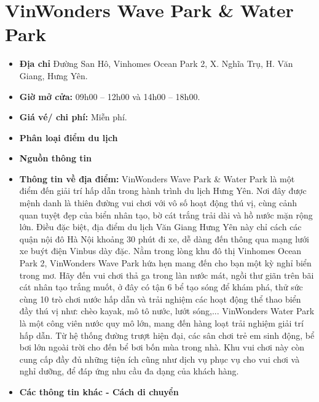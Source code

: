 \documentclass{article}
\begin{document}
\section{VinWonders Wave Park \& Water Park}
\begin{itemize}
    \item{\textbf{Địa chỉ}} Đường San Hô, Vinhomes Ocean Park 2, X. Nghĩa Trụ, H. Văn Giang, Hưng Yên.

    \item{\textbf{Giờ mở cửa:}} 09h00 – 12h00 và 14h00 – 18h00.

    \item{\textbf{Giá vé/ chi phí:}} Miễn phí.

    \item{\textbf{Phân loại điểm du lịch}} 

    \item{\textbf{Nguồn thông tin}} 

    \item{\textbf{Thông tin về địa điểm:}} VinWonders Wave Park \& Water Park là một điểm đến giải trí hấp dẫn trong hành trình du lịch Hưng Yên. Nơi đây được mệnh danh là thiên đường vui chơi với vô số hoạt động thú vị, cùng cảnh quan tuyệt đẹp của biển nhân tạo, bờ cát trắng trải dài và hồ nước mặn rộng lớn. Điều đặc biệt, địa điểm du lịch Văn Giang Hưng Yên này chỉ cách các quận nội đô Hà Nội khoảng 30 phút đi xe, dễ dàng đến thông qua mạng lưới xe buýt điện Vinbus dày đặc.
    Nằm trong lòng khu đô thị Vinhomes Ocean Park 2, VinWonders Wave Park hứa hẹn mang đến cho bạn một kỳ nghỉ biển trong mơ. Hãy đến vui chơi thả ga trong làn nước mát, ngồi thư giãn trên bãi cát nhân tạo trắng muốt, ở đây có tận 6 bể tạo sóng để khám phá, thử sức cùng 10 trò chơi nước hấp dẫn và trải nghiệm các hoạt động thể thao biển đầy thú vị như: chèo kayak, mô tô nước, lướt sóng,...
    VinWonders Water Park là một công viên nước quy mô lớn, mang đến hàng loạt trải nghiệm giải trí hấp dẫn. Từ hệ thống đường trượt hiện đại, các sân chơi trẻ em sinh động, bể bơi lớn ngoài trời cho đến bể bơi bốn mùa trong nhà. Khu vui chơi này còn cung cấp đầy đủ những tiện ích cũng như dịch vụ phục vụ cho vui chơi và nghỉ dưỡng, để đáp ứng nhu cầu đa dạng của khách hàng.
\end{itemize}

\begin{itemize}
    \item{\textbf{Các thông tin khác - Cách di chuyển}} 
\end{itemize}
\end{document}
